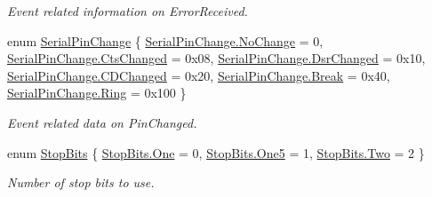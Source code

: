 \begin{DoxyCompactItemize}
\begin{DoxyCompactList}\small\item\em Event related information on Error\+Received. \end{DoxyCompactList}\item 
enum \mbox{\hyperlink{namespace_r_j_c_p_1_1_i_o_1_1_ports_abe559cc956a8d6ec76d331e52b774a71}{Serial\+Pin\+Change}} \{ \newline
\mbox{\hyperlink{namespace_r_j_c_p_1_1_i_o_1_1_ports_abe559cc956a8d6ec76d331e52b774a71a4bac8cdf0a968472b519b3b295d0d48b}{Serial\+Pin\+Change.\+No\+Change}} = 0, 
\mbox{\hyperlink{namespace_r_j_c_p_1_1_i_o_1_1_ports_abe559cc956a8d6ec76d331e52b774a71a50faef698c8d4c83049ba75a11fc6844}{Serial\+Pin\+Change.\+Cts\+Changed}} = 0x08, 
\mbox{\hyperlink{namespace_r_j_c_p_1_1_i_o_1_1_ports_abe559cc956a8d6ec76d331e52b774a71a5a49998aed1e1d414f0ef9cc605e4d5b}{Serial\+Pin\+Change.\+Dsr\+Changed}} = 0x10, 
\mbox{\hyperlink{namespace_r_j_c_p_1_1_i_o_1_1_ports_abe559cc956a8d6ec76d331e52b774a71a0ad3052878fa86d619f4400f03ee3c48}{Serial\+Pin\+Change.\+C\+D\+Changed}} = 0x20, 
\newline
\mbox{\hyperlink{namespace_r_j_c_p_1_1_i_o_1_1_ports_abe559cc956a8d6ec76d331e52b774a71ae4c38d6d45baf080943d323dd51a2ce8}{Serial\+Pin\+Change.\+Break}} = 0x40, 
\mbox{\hyperlink{namespace_r_j_c_p_1_1_i_o_1_1_ports_abe559cc956a8d6ec76d331e52b774a71ad4db177c94738b72bf9ce61e988ab1f1}{Serial\+Pin\+Change.\+Ring}} = 0x100
 \}
\begin{DoxyCompactList}\small\item\em Event related data on Pin\+Changed. \end{DoxyCompactList}\item 
enum \mbox{\hyperlink{namespace_r_j_c_p_1_1_i_o_1_1_ports_a56a13b591d46736acafe20f2976c84fa}{Stop\+Bits}} \{ \mbox{\hyperlink{namespace_r_j_c_p_1_1_i_o_1_1_ports_a56a13b591d46736acafe20f2976c84faa06c2cea18679d64399783748fa367bdd}{Stop\+Bits.\+One}} = 0, 
\mbox{\hyperlink{namespace_r_j_c_p_1_1_i_o_1_1_ports_a56a13b591d46736acafe20f2976c84faac1ced57069889668088d8d24691407b4}{Stop\+Bits.\+One5}} = 1, 
\mbox{\hyperlink{namespace_r_j_c_p_1_1_i_o_1_1_ports_a56a13b591d46736acafe20f2976c84faaaada29daee1d64ed0fe907043855cb7e}{Stop\+Bits.\+Two}} = 2
 \}
\begin{DoxyCompactList}\small\item\em Number of stop bits to use. \end{DoxyCompactList}\end{DoxyCompactItemize}


